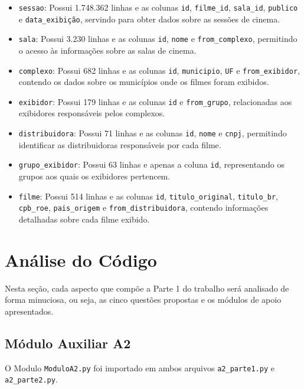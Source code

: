 \documentclass{article}
\begin{document}
\begin{itemize}
    \item \texttt{sessao}: Possui 1.748.362 linhas e as colunas \texttt{id}, \texttt{filme\_id}, \texttt{sala\_id}, \texttt{publico} e \texttt{data\_exibição}, servindo para obter dados sobre as sessões de cinema.

    \item \texttt{sala}: Possui 3.230 linhas e as colunas \texttt{id}, \texttt{nome} e \texttt{from\_complexo}, permitindo o acesso às informações sobre as salas de cinema.

    \item \texttt{complexo}: Possui 682 linhas e as colunas \texttt{id}, \texttt{municipio}, \texttt{UF} e \texttt{from\_exibidor}, contendo os dados sobre os municípios onde os filmes foram exibidos.

    \item \texttt{exibidor}: Possui 179 linhas e as colunas \texttt{id} e \texttt{from\_grupo}, relacionadas aos exibidores responsáveis pelos complexos.

    \item \texttt{distribuidora}: Possui 71 linhas e as colunas \texttt{id}, \texttt{nome} e \texttt{cnpj}, permitindo identificar as distribuidoras responsáveis por cada filme.

    \item \texttt{grupo\_exibidor}: Possui 63 linhas e apenas a coluna \texttt{id}, representando os grupos aos quais os exibidores pertencem.

    \item \texttt{filme}: Possui 514 linhas e as colunas \texttt{id}, \texttt{titulo\_original}, \texttt{titulo\_br}, \texttt{cpb\_roe}, \texttt{pais\_origem} e \texttt{from\_distribuidora}, contendo informações detalhadas sobre cada filme exibido.
\end{itemize}
\pagebreak
\section{Análise do Código}
Nesta seção, cada aspecto que compõe a Parte 1 do trabalho será analisado de forma minuciosa, ou seja, as cinco questões propostas e os módulos de apoio apresentados.
\subsection*{Módulo Auxiliar A2}
O Modulo \texttt{ModuloA2.py} foi importado em ambos arquivos \texttt{a2\_parte1.py} e \texttt{a2\_parte2.py}.
\end{document}
